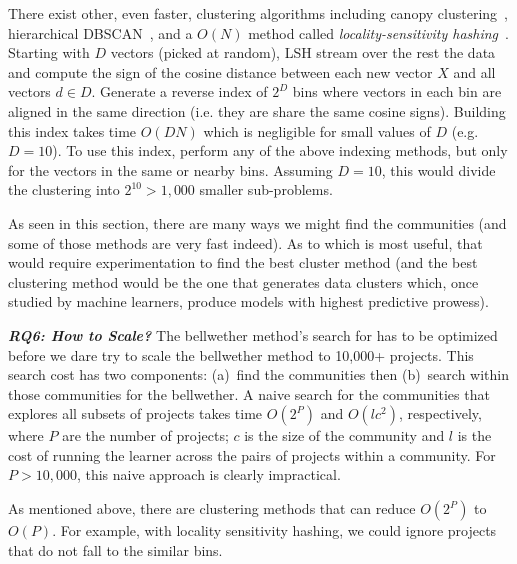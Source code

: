 There exist other, even faster, clustering algorithms
including canopy clustering~\cite{McCallum:2000}, hierarchical DBSCAN~\cite{campello2015hierarchical}, and a 
  $O(N)$ method called {\em  locality-sensitivity hashing}~\cite{Andoni:2015}.
Starting with  $D$ vectors (picked at random), LSH stream over the rest the data and compute the
sign of the cosine distance between each new vector $X$ and all vectors $d\in D$. Generate a reverse index of $2^D$ bins where vectors in each bin  are aligned in the same direction (i.e. they are share the same cosine signs).  Building this index takes time $O(DN)$ which is negligible  for small values of
$D$ (e.g. $D=10$). To use this index, perform  any of the above indexing methods, but only for the vectors in the same or nearby bins. Assuming $D=10$, this would divide the clustering into $2^{10}> 1,000$ smaller sub-problems. 


As seen in this section, 
there are many ways we might find the communities (and some of those methods are very fast indeed). As to which is most useful, that would require experimentation to find the best cluster method (and the best clustering method would be the one that generates data clusters which, once studied by machine learners, produce models with highest predictive prowess).


 

\textit{\textbf{ RQ6: How to Scale?}} The bellwether method's search for  has to be optimized
before we dare try to scale the bellwether method to 10,000+ projects. This search cost has two components: (a)~find the communities then (b)~search within those communities for the bellwether. A naive search for the  communities that explores all subsets of projects
  takes time $O(2^P)$   and   $O(lc^2)$,  respectively, where $P$ are the number of projects; $c$ is the size of the community and $l$ is the cost
  of running the learner across the pairs of projects within a community.
  For $P>10,000$, this naive approach is clearly impractical.

As mentioned above, there are clustering methods that can reduce
 $O(2^P)$  to $O(P)$. For example, with  locality sensitivity hashing, we could ignore projects
 that do  not fall to the similar bins.
 
